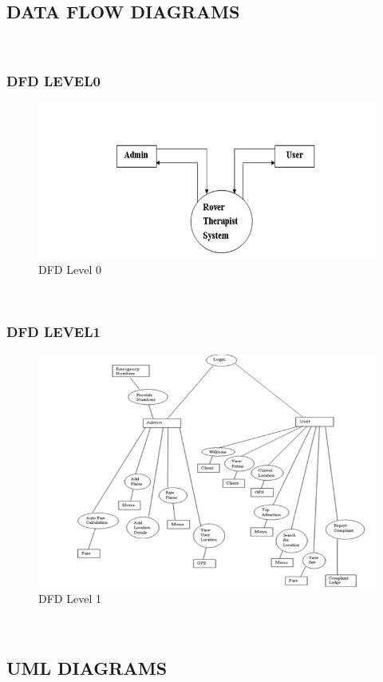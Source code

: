 \documentclass[12pt,a4paper]{article}
\begin{document}
\subsection{DATA FLOW DIAGRAMS}
\\
\subsubsection{DFD LEVEL0}
\begin{figure}[!htb]
\centering
\includegraphics[width=15 cm]{level}
\caption{DFD Level 0}
\end{figure}
\\
\newpage
\subsubsection{DFD LEVEL1}
\begin{figure}[!htb]
\centering
\includegraphics[width=15 cm]{levell}
\caption{DFD Level 1}
\end{figure}
\\
\newpage
\subsection{UML DIAGRAMS}
\\
\end{document}
